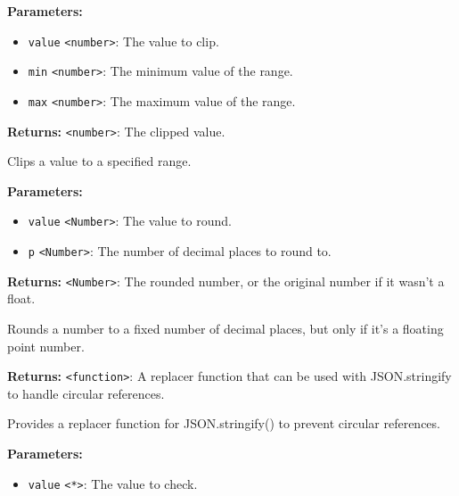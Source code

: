 \documentclass[12pt,a4paper]{article}
\begin{document}
\noindent \textbf{Parameters:}
\begin{itemize}
  \item \texttt{value} \texttt{<number>}: The value to clip.
  \item \texttt{min} \texttt{<number>}: The minimum value of the range.
  \item \texttt{max} \texttt{<number>}: The maximum value of the range.
\end{itemize}

\noindent \textbf{Returns:} \texttt{<number>}: The clipped value.

\noindent Clips a value to a specified range.

\vspace{5mm}
\noindent {}


\noindent \textbf{Parameters:}
\begin{itemize}
  \item \texttt{value} \texttt{<Number>}: The value to round.
  \item \texttt{p} \texttt{<Number>}: The number of decimal places to round to.
\end{itemize}

\noindent \textbf{Returns:} \texttt{<Number>}: The rounded number, or the original number if it wasn't a float.

\noindent Rounds a number to a fixed number of decimal places, but only if it's a floating point number.

\vspace{5mm}
\noindent {}


\noindent \textbf{Returns:} \texttt{<function>}: A replacer function that can be used with JSON.stringify to handle circular references.

\noindent Provides a replacer function for JSON.stringify() to prevent circular references.

\vspace{5mm}
\noindent {}


\noindent \textbf{Parameters:}
\begin{itemize}
  \item \texttt{value} \texttt{<*>}: The value to check.
\end{itemize}
\end{document}
